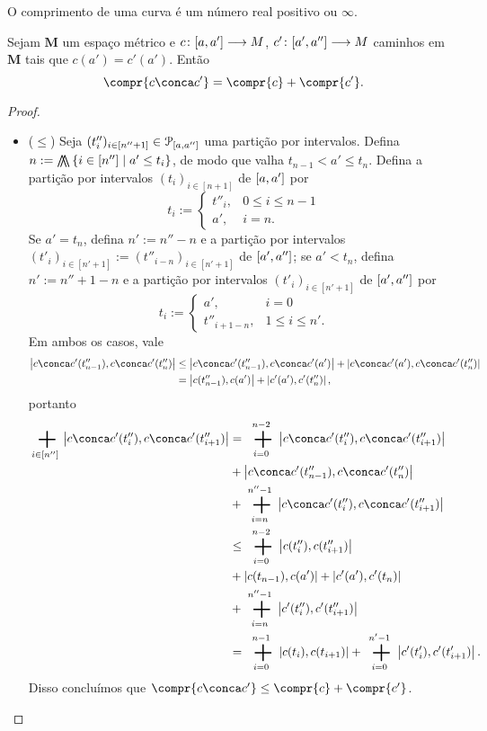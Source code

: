 O comprimento de uma curva é um número real positivo ou $\infty$.

\begin{proposition}
Sejam $\bm M$ um espaço métrico e ${c}\colon {\left[{a},{a'}\right]} \longrightarrow {M}$, ${c'}\colon {\left[{a'},{a''}\right]} \longrightarrow {M}$ caminhos em $\bm M$ tais que $c(a') = c'(a')$. Então
	\begin{equation*}
	\compr{c \conca c'} = \compr{c} + \compr{c'}.
	\end{equation*}
\end{proposition}
\begin{proof}
	\begin{itemize}
	\item ($\leq$) Seja $(t''_i)_{i \in [n''+1]} \in \mathcal{P}_{\left[{a},{a''}\right]}$ uma partição por intervalos. Defina $n := \min\set{i \in [n'']}{a' \leq t_i}$, de modo que valha $t_{n-1} < a' \leq t_n$. Defina a partição por intervalos $(t_i)_{i \in [n+1]}$ de $\left[{a},{a'}\right]$ por
		\begin{equation*}
		t_i := \begin{cases}
				t''_i,	& 0 \leq i \leq n-1 \\
				a',		& i = n.
				\end{cases}
		\end{equation*}
	Se $a' = t_n$, defina $n' := n''-n$ e a partição por intervalos $(t'_i)_{i \in [n'+1]} := (t''_{i-n})_{i \in [n'+1]}$ de $\left[{a'},{a''}\right]$; se $a' < t_n$, defina $n' := n''+1-n$ e a partição por intervalos $(t'_i)_{i \in [n'+1]}$ de $\left[{a'},{a''}\right]$ por
		\begin{equation*}
		t_i := \begin{cases}
				a',				& i=0 \\
				t''_{i+1-n},	& 1 \leq i \leq n'.
				\end{cases}
		\end{equation*}
	Em ambos os casos, vale
		\begin{align*}
		\dist{c \conca c'(t''_{n-1})}{c \conca c'(t''_n)} &\leq \dist{c \conca c'(t''_{n-1})}{c \conca c'(a')} + \dist{c \conca c'(a')}{c \conca c'(t''_n)} \\
			&= \dist{c(t''_{n-1})}{c(a')} + \dist{c'(a')}{c'(t''_n)},
		\end{align*}
	portanto
		\begin{align*}
		\sum_{i \in [n'']} \dist{c \conca c'(t''_i)}{c \conca c'(t''_{i+1})} &= \sum_{i=0}^{n-2} \dist{c \conca c'(t''_i)}{c \conca c'(t''_{i+1})} \\
			&+ \dist{c \conca c'(t''_{n-1})}{c \conca c'(t''_n)} \\
			&+ \sum_{i=n}^{n''-1} \dist{c \conca c'(t''_i)}{c \conca c'(t''_{i+1})} \\
			&\leq \sum_{i=0}^{n-2} \dist{c(t''_i)}{c(t''_{i+1})} \\
			&+ \dist{c(t_{n-1})}{c(a')} + \dist{c'(a')}{c'(t_n)} \\
			&+ \sum_{i=n}^{n''-1} \dist{c'(t''_i)}{c'(t''_{i+1})} \\
			&= \sum_{i=0}^{n-1} \dist{c(t_i)}{c(t_{i+1})} + \sum_{i=0}^{n'-1} \dist{c'(t'_i)}{c'(t'_{i+1})}.
		\end{align*}
	Disso concluímos que $\compr{c \conca c'} \leq \compr{c} + \compr{c'}$.


\end{itemize}
\end{proof}
